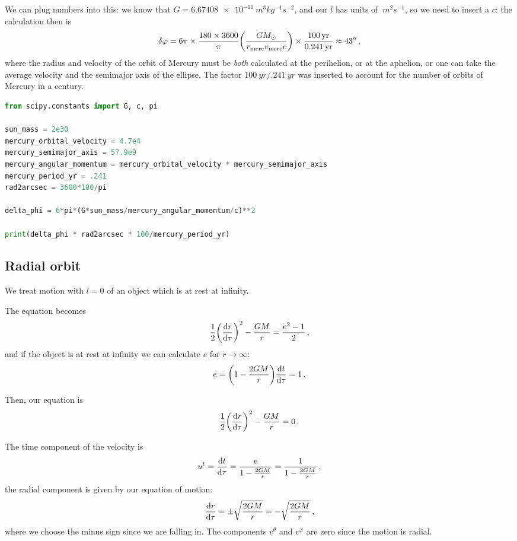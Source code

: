 \documentclass[main.tex]{subfiles}
\begin{document}
We can plug numbers into this: we know that \(G = \SI{6.67408e-11}{m^3 kg^{-1} s^{-2}}\), and our \(l\) has units of \(\SI{}{m^2s^{-1}}\), so we need to insert a \(c\): the calculation then is 
%
\begin{align}
  \delta \varphi = 6 \pi \times \frac{180 \times 3600}{\pi }  \qty(\frac{G M_{\odot}}{r _{\text{merc}} v _{\text{merc}} c}) \times \frac{\SI{100}{yr}}{\SI{.241}{yr}} \approx 43''
\,,
\end{align}
%
where the radius and velocity of the orbit of Mercury must be \emph{both} calculated at the perihelion, or at the aphelion, or one can take the average velocity and the semimajor axis of the ellipse. 
The factor \(\SI{100}{yr} / \SI{.241}{yr}\) was inserted to account for the number of orbits of Mercury in a century.

\begin{lstlisting}[language=Python]
from scipy.constants import G, c, pi

sun_mass = 2e30
mercury_orbital_velocity = 4.7e4
mercury_semimajor_axis = 57.9e9
mercury_angular_momentum = mercury_orbital_velocity * mercury_semimajor_axis
mercury_period_yr = .241
rad2arcsec = 3600*180/pi

delta_phi = 6*pi*(G*sun_mass/mercury_angular_momentum/c)**2

print(delta_phi * rad2arcsec * 100/mercury_period_yr)
\end{lstlisting}

\subsection{Radial orbit}

We treat motion with \(l=0\) of an object which is at rest at infinity. 

The equation becomes 
%
\begin{align}
  \frac{1}{2} \qty(\dv{r}{\tau })^2 - \frac{GM}{r} = \frac{e^2 - 1}{2}
\,,
\end{align}
%
and if the object is at rest at infinity we can calculate \(e\) for \(r \rightarrow \infty\): 
%
\begin{align}
  e = \qty(1 - \frac{2GM}{r}) \dv{t}{\tau } = 1
\,. 
\end{align}

Then, our equation is 
%
\begin{align}
\frac{1}{2} \qty(\dv{r}{\tau })^2 - \frac{GM}{r} =0
\,. 
\end{align}
%

The time component of the velocity is 
%
\begin{align}
  u^{t} = \dv{t}{\tau } = \frac{e}{1 - \frac{2GM}{r}} = \frac{1}{1 - \frac{2GM}{r}} 
\,,
\end{align}
%
the radial component is given by our equation of motion: 
%
\begin{align}
  \dv{r}{\tau } = \pm \sqrt{\frac{2GM}{r}} = - \sqrt{\frac{2GM}{r}} 
\,,
\end{align}
%
where we choose the minus sign since we are falling in. The components \(v^{\theta }\) and \(v^{\varphi }\) are zero since the motion is radial.  
\end{document}
